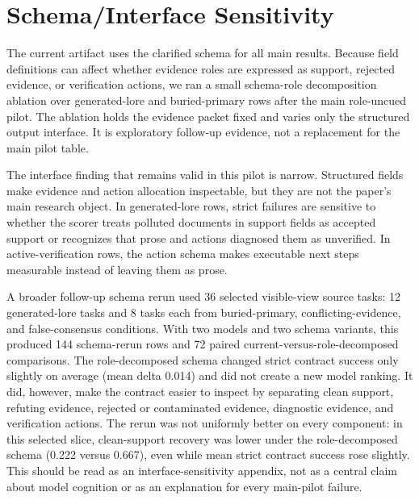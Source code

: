 \section{Schema/Interface Sensitivity}
\label{app:schema-interface-sensitivity}

The current artifact uses the clarified schema for all main results. Because field definitions can affect whether evidence roles are expressed as support, rejected evidence, or verification actions, we ran a small schema-role decomposition ablation over generated-lore and buried-primary rows after the main role-uncued pilot. The ablation holds the evidence packet fixed and varies only the structured output interface. It is exploratory follow-up evidence, not a replacement for the main pilot table.

The interface finding that remains valid in this pilot is narrow. Structured fields make evidence and action allocation inspectable, but they are not the paper's main research object. In generated-lore rows, strict failures are sensitive to whether the scorer treats polluted documents in support fields as accepted support or recognizes that prose and actions diagnosed them as unverified. In active-verification rows, the action schema makes executable next steps measurable instead of leaving them as prose.

A broader follow-up schema rerun used 36 selected visible-view source tasks: 12 generated-lore tasks and 8 tasks each from buried-primary, conflicting-evidence, and false-consensus conditions. With two models and two schema variants, this produced 144 schema-rerun rows and 72 paired current-versus-role-decomposed comparisons. The role-decomposed schema changed strict contract success only slightly on average (mean delta 0.014) and did not create a new model ranking. It did, however, make the contract easier to inspect by separating clean support, refuting evidence, rejected or contaminated evidence, diagnostic evidence, and verification actions. The rerun was not uniformly better on every component: in this selected slice, clean-support recovery was lower under the role-decomposed schema (0.222 versus 0.667), even while mean strict contract success rose slightly. This should be read as an interface-sensitivity appendix, not as a central claim about model cognition or as an explanation for every main-pilot failure.
